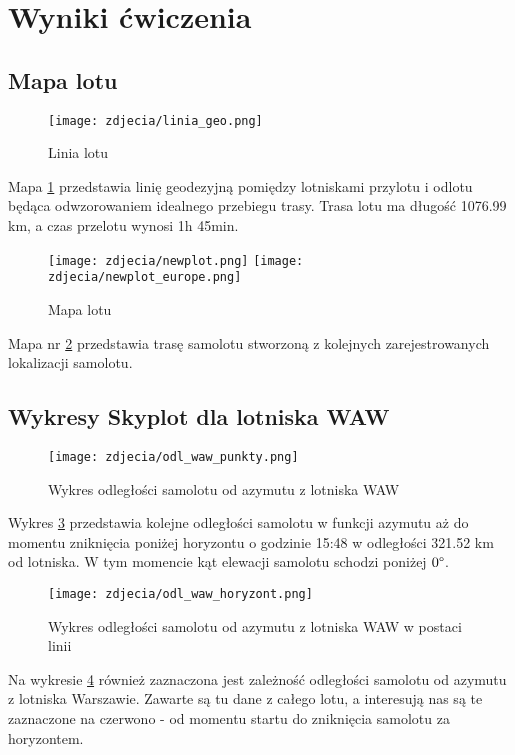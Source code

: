 \documentclass[fleqn,10pt,a4paper]{article}
\begin{document}
\newpage
\section{Wyniki ćwiczenia}
\subsection{Mapa lotu}


\begin{figure}[ht!]
  \centering
  \texttt{[image: zdjecia/linia\_geo.png]}
  \caption{Linia lotu}
  \label{linia}
\end{figure}
Mapa \ref{linia} przedstawia linię geodezyjną pomiędzy lotniskami przylotu i odlotu będąca odwzorowaniem idealnego przebiegu trasy.
Trasa lotu ma długość 1076.99 km, a czas przelotu wynosi 1h 45min.

\begin{figure}[ht!]
  \centering
  \texttt{[image: zdjecia/newplot.png]}
  \texttt{[image: zdjecia/newplot\_europe.png]}
  \caption{Mapa lotu}
  \label{newplot}
\end{figure}
Mapa nr \ref{newplot} przedstawia trasę samolotu stworzoną z kolejnych zarejestrowanych lokalizacji samolotu.
  
\newpage

\subsection{Wykresy Skyplot dla lotniska WAW}
\begin{figure}[h!]
  \centering
  \texttt{[image: zdjecia/odl\_waw\_punkty.png]}
  \caption{Wykres odległości samolotu od azymutu z lotniska WAW}
  \label{skyplot_waw}
\end{figure}

Wykres \ref{skyplot_waw} przedstawia kolejne odległości samolotu w funkcji azymutu aż do momentu zniknięcia poniżej
horyzontu o godzinie 15:48 w odległości 321.52 km od lotniska. W tym momencie kąt elewacji samolotu schodzi poniżej $0 \degree$.

\begin{figure}[ht!]
  \centering
  \texttt{[image: zdjecia/odl\_waw\_horyzont.png]}
  \caption{Wykres odległości samolotu od azymutu z lotniska WAW w postaci linii}
  \label{skyplot_odl_waw}
\end{figure}

Na wykresie \ref{skyplot_odl_waw} również zaznaczona jest zależność odległości samolotu od azymutu z lotniska Warszawie.
Zawarte są tu dane z całego lotu, a interesują nas są te zaznaczone na czerwono - od momentu startu do zniknięcia samolotu za horyzontem.
\end{document}
